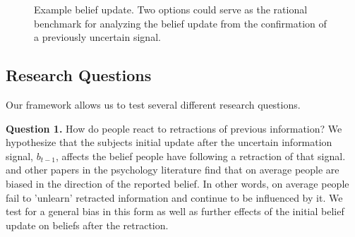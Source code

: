 \documentclass{article}
\begin{document}
\begin{figure}[!htb]
\centering
{}
\caption{\small{Example belief update. Two options could serve as the rational benchmark for analyzing the belief update from the confirmation of a previously uncertain signal.}}
\label{fig:example_confirmation}
\end{figure}


\subsection{Research Questions}
Our framework allows us to test several different research questions. 

\textbf{Question 1.} How do people react to retractions of previous information? We hypothesize that the subjects initial update after the uncertain information signal, $b_{t-1}$, affects the belief people have following a retraction of that signal. \cite{Goncalves2022} and other papers in the psychology literature find that on average people are biased in the direction of the reported belief. In other words, on average people fail to 'unlearn' retracted information and continue to be influenced by it. We test for a general bias in this form as well as further effects of the initial belief update on beliefs after the retraction.
\end{document}
